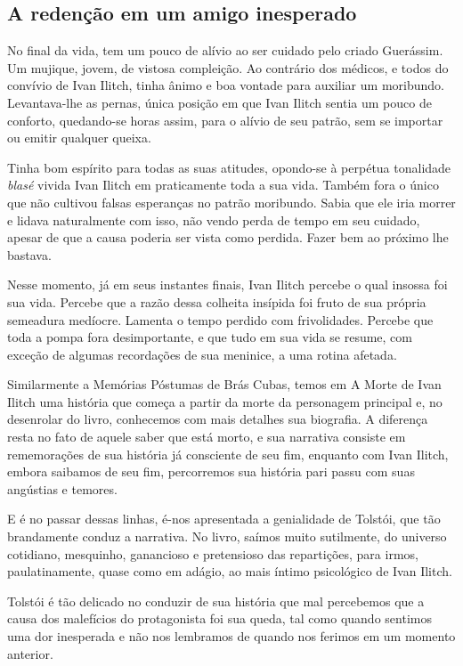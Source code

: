 \documentclass[12pt]{extarticle}
\begin{document}
\subsection{A redenção em um amigo inesperado}

No final da vida, tem um pouco de alívio ao ser cuidado pelo criado
Guerássim. Um mujique, jovem, de vistosa compleição. Ao contrário dos
médicos, e todos do convívio de Ivan Ilitch, tinha ânimo e boa vontade
para auxiliar um moribundo. Levantava-lhe as pernas, única posição em
que Ivan Ilitch sentia um pouco de conforto, quedando-se horas assim,
para o alívio de seu patrão, sem se importar ou emitir qualquer queixa.

Tinha bom espírito para todas as suas atitudes, opondo-se à perpétua
tonalidade \emph{blasé} vivida Ivan Ilitch em praticamente toda a sua
vida. Também fora o único que não cultivou falsas esperanças no patrão
moribundo. Sabia que ele iria morrer e lidava naturalmente com isso, não
vendo perda de tempo em seu cuidado, apesar de que a causa poderia ser
vista como perdida. Fazer bem ao próximo lhe bastava.

Nesse momento, já em seus instantes finais, Ivan Ilitch percebe o qual
insossa foi sua vida. Percebe que a razão dessa colheita insípida foi
fruto de sua própria semeadura medíocre. Lamenta o tempo perdido com
frivolidades. Percebe que toda a pompa fora desimportante, e que tudo em
sua vida se resume, com exceção de algumas recordações de sua meninice,
a uma rotina afetada.

Similarmente a Memórias Póstumas de Brás Cubas, temos em A Morte de Ivan
Ilitch uma história que começa a partir da morte da personagem principal
e, no desenrolar do livro, conhecemos com mais detalhes sua biografia. A
diferença resta no fato de aquele saber que está morto, e sua narrativa
consiste em rememorações de sua história já consciente de seu fim,
enquanto com Ivan Ilitch, embora saibamos de seu fim, percorremos sua
história pari passu com suas angústias e temores.

E é no passar dessas linhas, é-nos apresentada a genialidade de Tolstói,
que tão brandamente conduz a narrativa. No livro, saímos muito
sutilmente, do universo cotidiano, mesquinho, ganancioso e pretensioso
das repartições, para irmos, paulatinamente, quase como em adágio, ao
mais íntimo psicológico de Ivan Ilitch.

Tolstói é tão delicado no conduzir de sua história que mal percebemos
que a causa dos malefícios do protagonista foi sua queda, tal como
quando sentimos uma dor inesperada e não nos lembramos de quando nos
ferimos em um momento anterior.
\end{document}
